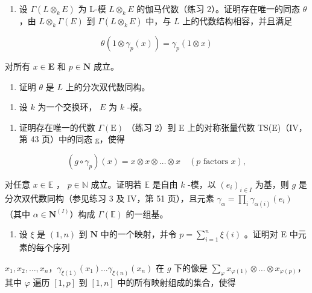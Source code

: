 \begin{enumerate}
\def\labelenumi{\alph{enumi})}
\tightlist
\item
  设 \(\Gamma(L \otimes_k E)\) 为 L-模 \(L \otimes_k E\) 的伽马代数（练习 2）。证明存在唯一的同态 \(\theta\) ，由 \(L \otimes_k \Gamma(E)\) 到 \(\Gamma(L \otimes_k E)\) 中，与 \(L\) 上的代数结构相容，并且满足
\end{enumerate}

\[
\theta (1 \otimes \gamma_ {p} (x)) = \gamma_ {p} (1 \otimes x)
\]

对所有 \(x \in \mathbf{E}\) 和 \(p \in \mathbf{N}\) 成立。

\begin{enumerate}
\def\labelenumi{\alph{enumi})}
\setcounter{enumi}{1}
\tightlist
\item
  证明 \(\theta\) 是 \(L\) 上的分次双代数同构。
\end{enumerate}

\begin{enumerate}
\def\labelenumi{\arabic{enumi})}
\setcounter{enumi}{7}
\tightlist
\item
  设 \(k\) 为一个交换环， \(E\) 为 \(k\) -模。
\end{enumerate}

\begin{enumerate}
\def\labelenumi{\alph{enumi})}
\tightlist
\item
  证明存在唯一的代数 \(\Gamma(\mathrm{E})\) （练习 2）到 E 上的对称张量代数 TS(E)（IV，第 43 页）中的同态 g，使得
\end{enumerate}

\[
(g \circ \gamma_ {p}) (x) = x \otimes x \otimes \dots \otimes x \quad (p \text {   factors   } x),
\]

对任意 \(x \in \mathbb{E}\) ， \(p \in \mathbb{N}\) 成立。证明若 \(\mathbb{E}\) 是自由 \(k\) -模，以 \((e_i)_{i \in I}\) 为基，则 \(g\) 是分次双代数同构（参见练习 3 及 IV，第 51 页），且元素 \(\gamma_\alpha = \prod_i \gamma_{\alpha(i)}(e_i)\) （其中 \(\alpha \in \mathbf{N}^{(I)}\)）构成 \(\Gamma(\mathbb{E})\) 的一组基。

\begin{enumerate}
\def\labelenumi{\alph{enumi})}
\setcounter{enumi}{1}
\tightlist
\item
  设 \(\xi\) 是 \((1, n)\) 到 \(\mathbf{N}\) 中的一个映射，并令 \(p = \sum_{i=1}^{n} \xi(i)\) 。证明对 E 中元素的每个序列
\end{enumerate}

\(x_{1}, x_{2}, \ldots, x_{n}\)，\(\gamma_{\xi(1)}(x_{1}) \ldots \gamma_{\xi(n)}(x_{n})\) 在 \(g\) 下的像是 \(\sum_{\varphi} x_{\varphi(1)} \otimes \ldots \otimes x_{\varphi(p)}\)，其中 \(\varphi\) 遍历 \([1, p]\) 到 \([1, n]\) 中的所有映射组成的集合，使得

